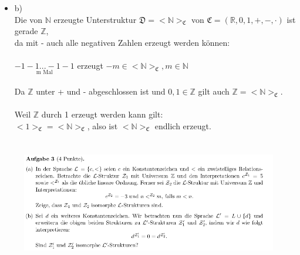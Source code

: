 \documentclass[a4paper]{scrartcl}
\begin{document}
\begin{itemize}
    \item b)\\
        Die von $\mathds{N}$ erzeugte Unterstruktur $\mathfrak{D} = <\mathds{N}>_\mathfrak{C}$ von $\mathfrak{C} = (\mathds{R},0,1,+,-,\cdot)$ ist gerade $\mathds{Z}$,\\
        da mit - auch alle negativen Zahlen erzeugt werden können:\\
        \\$\underset{\text{m Mal}}{-1-1...-1-1}$ erzeugt $-m \in <\mathds{N}>_\mathfrak{C}, m \in \mathds{N}$\\
        \\Da $\mathds{Z}$ unter + und - abgeschlossen ist und $0,1 \in \mathds{Z}$ gilt auch $\mathds{Z} = <\mathds{N}>_\mathfrak{C}$.\\
        \\Weil $\mathds{Z}$ durch 1 erzeugt werden kann gilt:\\
        $<1>_\mathfrak{C} = <\mathds{N}>_\mathfrak{C}$, also ist $<\mathds{N}>_\mathfrak{C}$ endlich erzeugt.

\end{itemize}

\section*{}%
\label{sec:aufgabe_3}

\begin{figure}[H]
    \centering
    \includegraphics[scale=0.6]{./A-3.png}
    \label{fig:}
\end{figure}
\end{document}
